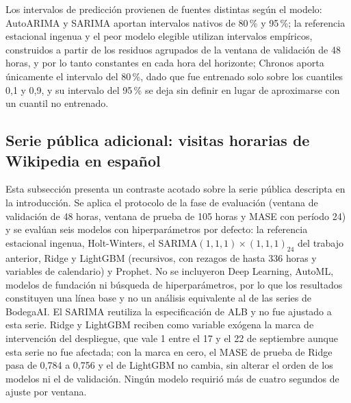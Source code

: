 Los intervalos de predicción provienen de fuentes distintas según el modelo: AutoARIMA y SARIMA aportan
intervalos nativos de 80\,\% y 95\,\%; la referencia estacional ingenua y el peor modelo elegible utilizan
intervalos empíricos, construidos a partir de los residuos agrupados de la ventana de validación de 48
horas, y por lo tanto constantes en cada hora del horizonte; Chronos aporta únicamente el intervalo del
80\,\%, dado que fue entrenado solo sobre los cuantiles 0,1 y 0,9, y su intervalo del 95\,\% se deja sin
definir en lugar de aproximarse con un cuantil no entrenado.

\subsection{Serie pública adicional: visitas horarias de Wikipedia en español}
\label{sec:wikipedia}

Esta subsección presenta un contraste acotado sobre la serie pública descripta en la introducción. Se aplica
el protocolo de la fase de evaluación (ventana de validación de 48 horas, ventana de prueba de 105 horas y
MASE con período 24) y se evalúan seis modelos con hiperparámetros por defecto: la referencia estacional
ingenua, Holt-Winters, el SARIMA$(1,1,1)\times(1,1,1)_{24}$ del trabajo anterior, Ridge y LightGBM
(recursivos, con rezagos de hasta 336 horas y variables de calendario) y Prophet. No se incluyeron Deep
Learning, AutoML, modelos de fundación ni búsqueda de hiperparámetros, por lo que los resultados
constituyen una línea base y no un análisis equivalente al de las series de BodegaAI. El SARIMA reutiliza la
especificación de ALB y no fue ajustado a esta serie. Ridge y LightGBM reciben como variable exógena la marca de intervención del despliegue, que vale 1 entre el 17 y el 22 de septiembre aunque esta serie no fue afectada; con la marca en cero, el MASE de prueba de Ridge pasa de 0,784 a 0,756 y el de LightGBM no cambia, sin alterar el orden de los modelos ni el de validación. Ningún modelo requirió más de cuatro segundos de
ajuste por ventana.

